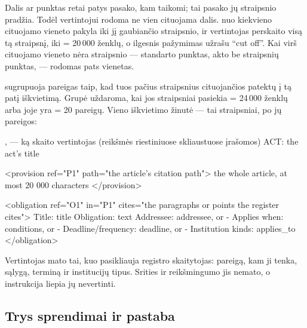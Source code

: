 Dalis ar punktas retai patys pasako, kam taikomi; tai pasako jų straipsnio pradžia. Todėl
vertintojui rodoma ne vien cituojama dalis.  nuo kiekvieno cituojamo vieneto
pakyla iki jį gaubiančio straipsnio, ir vertintojas perskaito visą tą straipsnį, iki
 = 20\,000 ženklų, o ilgesnis pažymimas užrašu \enquote{cut off}. Kai virš
cituojamo vieneto nėra straipsnio --- standarto punktas, akto be straipsnių punktas, ---
rodomas pats vienetas.

 sugrupuoja pareigas taip, kad tuos pačius straipsnius cituojančios patektų į tą
patį iškvietimą. Grupė uždaroma, kai jos straipsniai pasiekia  = 24\,000 ženklų
arba joje yra  = 20 pareigų. Vieno iškvietimo žinutė --- tai
straipsniai, po jų pareigos:

\begin{codefile}{,  --- ką skaito vertintojas (reikšmės riestiniuose skliaustuose įrašomos)}
ACT: {the act's title}

<provision ref="P1" path="{the article's citation path}">
{the whole article, at most 20 000 characters}
</provision>

<obligation ref="O1" in="P1" cites="{the paragraphs or points the register cites}">
Title: {title}
Obligation: {text}
Addressee: {addressee, or -}
Applies when: {conditions, or -}
Deadline/frequency: {deadline, or -}
Institution kinds: {applies_to}
</obligation>
\end{codefile}

Vertintojas mato tai, kuo pasikliauja registro skaitytojas: pareigą, kam ji tenka, sąlygą,
terminą ir institucijų tipus. Srities ir reikšmingumo jis nemato, o instrukcija liepia jų
nevertinti.

\subsection{Trys sprendimai ir pastaba}

